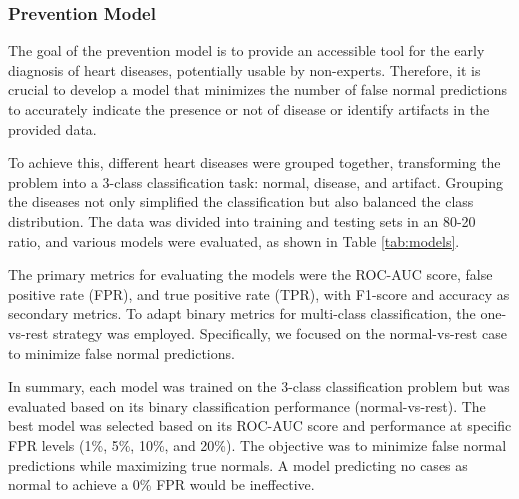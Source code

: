 \subsubsection*{Prevention Model}
The goal of the prevention model is to provide an accessible tool for the early diagnosis of heart 
diseases, potentially usable by non-experts. Therefore, it is crucial to develop a model that 
minimizes the number of false normal predictions to accurately indicate the presence or not
of disease or identify artifacts in the provided data.

To achieve this, different heart diseases were grouped together, transforming the problem 
into a 3-class classification task: normal, disease, and artifact. Grouping the diseases not 
only simplified the classification but also balanced the class distribution. The data was 
divided into training and testing sets in an 80-20 ratio, and various models were evaluated, 
as shown in Table \ref{tab:models}.

The primary metrics for evaluating the models were the ROC-AUC score, false positive rate (FPR), 
and true positive rate (TPR), with F1-score and accuracy as secondary metrics. 
To adapt binary metrics for multi-class classification, the one-vs-rest strategy was employed. 
Specifically, we focused on the normal-vs-rest case to minimize false normal predictions.

In summary, each model was trained on the 3-class classification problem but was evaluated based on 
its binary classification performance (normal-vs-rest). The best model was selected based on its 
ROC-AUC score and performance at specific FPR levels (1\%, 5\%, 10\%, and 20\%). The objective was 
to minimize false normal predictions while maximizing true normals. A model predicting no cases 
as normal to achieve a 0\% FPR would be ineffective.